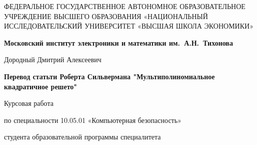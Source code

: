 \documentclass[a4paper,12pt]{report}
\begin{document}
\thispagestyle{empty}

\begin{center}

\sc
ФЕДЕРАЛЬНОЕ  ГОСУДАРСТВЕННОЕ АВТОНОМНОЕ
ОБРАЗОВАТЕЛЬНОЕ УЧРЕЖДЕНИЕ ВЫСШЕГО ОБРАЗОВАНИЯ
«НАЦИОНАЛЬНЫЙ ИССЛЕДОВАТЕЛЬСКИЙ УНИВЕРСИТЕТ
«ВЫСШАЯ ШКОЛА ЭКОНОМИКИ»
\end{center}

\begin{center}
\bf Московский институт электроники и математики им.~А.Н.~Тихонова
\end{center}

\vspace{1cm}

\begin{center}
Дородный Дмитрий Алексеевич
\end{center}

\vspace{1cm}

\begin{center}
\bf Перевод статьти Роберта Сильвермана  "Мультиполиномиальное квадратичное решето"
\end{center}

\vspace{10mm}

\begin{center}
Курсовая работа \par
по специальности 10.05.01 «Компьютерная безопасность» \par
студента образовательной программы специалитета
\end{center}

\vfill
\end{document}
